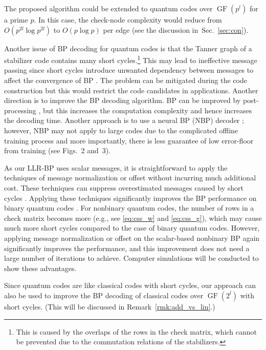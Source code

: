 \documentclass{ieeeaccess}
\DeclareMathOperator{\GF}{GF}
\theoremstyle{definition}		%
\begin{document}
The proposed algorithm could be extended to quantum codes over $\GF(p^l)$ for a prime $p$. %
In this case, the check-node complexity would reduce from $O(p^{2l}\log p^{2l})$ to $O(p\log p)$ per edge (see the discussion in~Sec.~\ref{sec:con}).




Another issue of BP decoding for quantum codes is that the Tanner graph of a stabilizer code contains many short cycles.\footnote{This is caused by the overlaps of the rows in the check matrix, which cannot be prevented due to the commutation relations of the stabilizers.} 
This may lead to ineffective message passing \mbox{\cite{MMM04,PC08,Wan+12,Bab+15,ROJ19,PK19,LP19,KL20,RWBC20}}
since short cycles introduce unwanted dependency between messages to affect the convergence of BP \cite[Sec~4.2]{Gal63}. %
The problem can be mitigated during the code construction \cite{MMM04,KHIS11,KP13,TZ14,PK19}  but this would restrict the code candidates in applications. 
%
Another direction is to improve the BP decoding algorithm.  
BP can be improved by post-processing \cite{PC08,Wan+12,Bab+15,ROJ19,PK19,RWBC20}, 
but this increases the computation complexity  and hence increases the decoding time. 
Another approach is to use a neural BP (NBP) decoder \cite{LP19}; however, NBP may not apply to large codes due to the complicated offline training process and more importantly, there is less guarantee of low error-floor from training (see Figs.~2 and~3).

As our LLR-BP uses scalar messages, it is straightforward to apply the techniques of message normalization or offset \cite{CF02b,CDE+05,YHB04} without incurring much additional cost. These techniques can suppress overestimated messages caused by short cycles \cite{YHB04}. Applying these techniques significantly improves the BP performance on binary quantum codes \cite{KL20}. 
%
For nonbinary quantum codes, the number of rows in a check matrix becomes more (e.g., see \eqref{eq:css_w} and \eqref{eq:css_g}), which may cause much more short cycles compared to the case of binary quantum codes.
However, applying message normalization or offset on the scalar-based nonbinary BP again significantly improves the performance,
and this improvement does not need a large number of iterations to achieve.
Computer simulations will be conducted to show these advantages. 


Since quantum codes are like classical codes with short cycles, our approach can also be used to improve the BP decoding of classical codes over $\GF(2^l)$ with short cycles. (This will be discussed in Remark~\ref{rmk:add_vs_lin}.)
\end{document}
